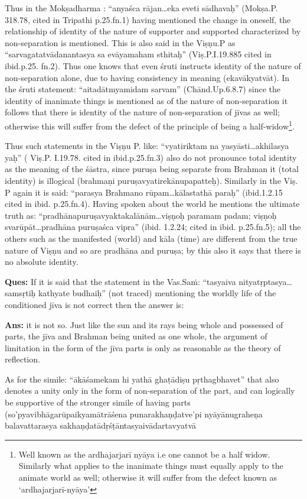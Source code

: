 Thus in the Mokṣadharma : “anyaśca rājan…eka eveti sādhavaḥ” (Mokṣa.P. 318.78, cited in Tripathi p.25.fn.1)  having mentioned the change in oneself, the relationship of identity of the nature of supporter and supported characterized by non-separation is mentioned.  This is also said in the Viṣṇu.P as “sarvagatatvādanantasya sa evāyamaham sthitaḥ” (Viṣ.P.I.19.885 cited in ibid.p.25. fn.2).   Thus one knows that even śruti instructs identity of the nature of non-separation alone, due to having consistency in meaning (ekavākyatvāt). In the śruti statement: “aitadātmyamidam sarvam” (Chānd.Up.6.8.7) since the identity of inanimate things is mentioned as of the nature of non-separation it follows that there is identity of the nature of non-separation of jīvas as well; otherwise this will suffer from the defect of the principle of being a half-widow\footnote{Well known as the ardhajarjarī nyāya i.e one cannot be a half widow. Similarly what applies to the inanimate things must equally apply to the animate world as well; otherwise it will suffer from the defect known as ‘ardhajarjarī-nyāya’}. 

Thus such statements in the Viṣṇu P. like: “vyatiriktam na yasyāsti…akhilasya yaḥ” ( Viṣ.P. I.19.78. cited in ibid.p.25.fn.3) also do not pronounce total identity as the meaning of the śāstra, since puruṣa being separate from Brahman it (total identity) is illogical (brahmaṇi puruṣavyatirekānupapatteḥ). Similarly in the Viṣ. P again it is said: “parasya Brahmano rūpam…kālastathā paraḥ” (ibid.1.2.15 cited in ibid. p.25.fn.4). Having spoken about the world he mentions the ultimate truth as: “pradhānapuruṣavyaktakalānām…viṣṇoḥ paramam padam; viṣṇoḥ svarūpāt…pradhāna puruṣaśca vipra” (ibid. 1.2.24; cited in ibid. p.25.fn.5); all the others such as the manifested (world) and kāla (time) are different from the true nature of Viṣṇu and so are pradhāna and puruṣa; by this also it says that there is no absolute identity. 

\textbf{Ques:} If it is said that the statement in the Vas.Saṁ: “tasyaiva nityatṛptasya…samsṛtiḥ kathyate budhaiḥ” (not traced) mentioning the worldly life of the conditioned jīva is not correct then the answer is: 

\textbf{Ans:} it is not so. Just like the sun and its rays being whole and possessed of parts, the jīva and Brahman being united as one whole, the argument of limitation in the form of the jīva parts is only as reasonable as the theory of reflection.

As for the simile: “ākāśamekam hi yathā ghaṭādiṣu pṛthagbhavet” that also denotes a unity only in the form of non-separation of the part, and can logically be supportive of the stronger simile of having parts (so’pyavibhāgarūpaikyamātrāśena punarakhaṇḍatve’pi nyāyānugra\-heṇa balavattarasya sakhaṇḍatādṛśṭāntasyaivādartavyatvā

